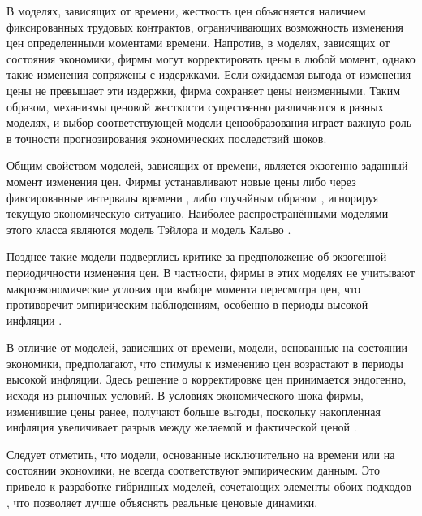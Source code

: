 	В моделях, зависящих от времени, жесткость цен объясняется наличием фиксированных трудовых контрактов, ограничивающих возможность изменения цен определенными моментами времени. Напротив, в моделях, зависящих от состояния экономики, фирмы могут корректировать цены в любой момент, однако такие изменения сопряжены с издержками. Если ожидаемая выгода от изменения цены не превышает эти издержки, фирма сохраняет цены неизменными. Таким образом, механизмы ценовой жесткости существенно различаются в разных моделях, и выбор соответствующей модели ценообразования играет важную роль в точности прогнозирования экономических последствий шоков.
	
	Общим свойством моделей, зависящих от времени, является экзогенно заданный момент изменения цен. Фирмы устанавливают новые цены либо через фиксированные интервалы времени \cite{Taylor1980}, либо случайным образом \cite{Calvo1983}, игнорируя текущую экономическую ситуацию. Наиболее распространёнными моделями этого класса являются модель Тэйлора \cite{Taylor1980} и модель Кальво \cite{Calvo1983}.
	
	Позднее такие модели подверглись критике за предположение об экзогенной периодичности изменения цен. В частности, фирмы в этих моделях не учитывают макроэкономические условия при выборе момента пересмотра цен, что противоречит эмпирическим наблюдениям, особенно в периоды высокой инфляции \cite{Barros2009, gagnon2009, NyawoRankin2016}.
	
	В отличие от моделей, зависящих от времени, модели, основанные на состоянии экономики, предполагают, что стимулы к изменению цен возрастают в периоды высокой инфляции. Здесь решение о корректировке цен принимается эндогенно, исходя из рыночных условий. В условиях экономического шока фирмы, изменившие цены ранее, получают больше выгоды, поскольку накопленная инфляция увеличивает разрыв между желаемой и фактической ценой \cite{Dotsey1999, golosov2007}.
	
	Следует отметить, что модели, основанные исключительно на времени или на состоянии экономики, не всегда соответствуют эмпирическим данным. Это привело к разработке гибридных моделей, сочетающих элементы обоих подходов \cite{Nakamura2008}, что позволяет лучше объяснять реальные ценовые динамики.
	

